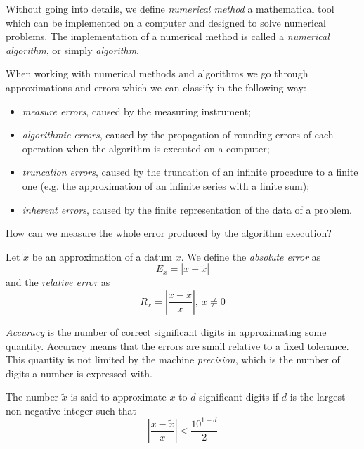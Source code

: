 Without going into details, we define \textit{numerical method} a mathematical tool which can be implemented on a computer and designed to solve numerical problems. The implementation of a numerical method is called a \textit{numerical algorithm}, or simply \textit{algorithm}.

When working with numerical methods and algorithms  we go through  approximations and errors which we can classify in the following way:

\begin{itemize}
    \item \textit{measure errors}, caused by the measuring instrument;
    \item \textit{algorithmic errors}, caused by the propagation of rounding errors of each operation when the algorithm is executed on a computer;
    \item \textit{truncation errors}, caused by the truncation of an infinite procedure to a finite one (e.g. the approximation of an infinite series with a finite sum);
    \item \textit{inherent errors}, caused by the finite representation of the data of a problem.
\end{itemize}

How can we measure the whole error produced by the algorithm execution?

\begin{definition}
    Let $\tilde{x}$ be an approximation of a datum $x$. We define the \textit{absolute error} as
    $$ E_x = |x - \tilde{x}| $$
    and the \textit{relative error} as
    $$ R_x = \left| \frac{x - \tilde{x}}{x} \right|,\ x \neq 0 $$
\end{definition}


\begin{definition}
    \textit{Accuracy} is the number of correct significant digits in approximating some quantity. Accuracy means that the errors are small relative to a fixed tolerance. This quantity is not limited by the machine \textit{precision}, which is the number of digits a number is expressed with.
\end{definition}

\begin{definition}
    The number $\tilde{x}$ is said to approximate $x$ to $d$ significant digits if $d$ is the largest non-negative integer such that
    $$ \left| \frac{x - \tilde{x}}{x} \right| < \frac{10^{1-d}}{2} $$
\end{definition}

